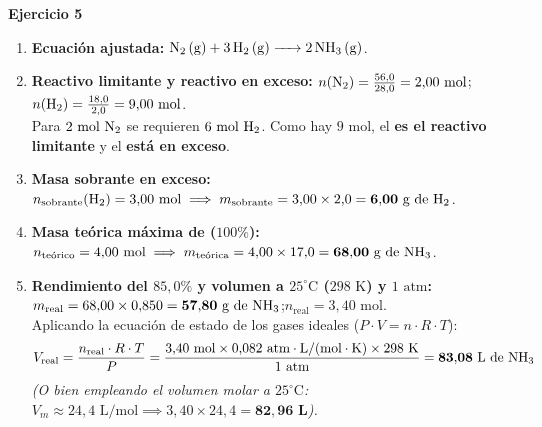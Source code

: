 \documentclass[11pt,a4paper]{article}
\begin{document}
\vspace{0.4cm}
\noindent\textbf{Ejercicio 5}
\begin{enumerate}[label=\textbf{\alph*)}, leftmargin=2em, itemsep=6pt]
    \item \textbf{Ecuación ajustada:} $\ce{N2 (g) + 3 H2 (g) -> 2 NH3 (g)}$.
    \item \textbf{Reactivo limitante y reactivo en exceso:}
    $n(\ce{N2}) = \frac{56{,}0}{28{,}0} = 2{,}00\text{ mol}$; $n(\ce{H2}) = \frac{18{,}0}{2{,}0} = 9{,}00\text{ mol}$.\\
    Para $2\text{ mol } \ce{N2}$ se requieren $6\text{ mol } \ce{H2}$. Como hay $9\text{ mol}$, el \textbf{ es el reactivo limitante} y el \textbf{ está en exceso}.
    \item \textbf{Masa sobrante en exceso:} $n_{\text{sobrante}}(\ce{H2}) = 3{,}00\text{ mol} \implies m_{\text{sobrante}} = 3{,}00 \times 2{,}0 = \mathbf{6{,}00\text{ g de } \ce{H2}}$.
    \item \textbf{Masa teórica máxima de  ($100\%$):} $n_{\text{teórico}} = 4{,}00\text{ mol} \implies m_{\text{teórica}} = 4{,}00 \times 17{,}0 = \mathbf{68{,}00\text{ g de } \ce{NH3}}$.
    \item \textbf{Rendimiento del $85{,}0\%$ y volumen a $25^\circ\text{C}$ ($298\text{ K}$) y $1\text{ atm}$:}
    $m_{\text{real}} = 68{,}00 \times 0{,}850 = \mathbf{57{,}80\text{ g de } \ce{NH3}}$;\quad $n_{\text{real}} = 3{,}40\text{ mol}$.\\
    Aplicando la ecuación de estado de los gases ideales ($P \cdot V = n \cdot R \cdot T$):
    \[
    V_{\text{real}} = \frac{n_{\text{real}} \cdot R \cdot T}{P} = \frac{3{,}40\text{ mol} \times 0{,}082\text{ atm}\cdot\text{L}/(\text{mol}\cdot\text{K}) \times 298\text{ K}}{1\text{ atm}} = \mathbf{83{,}08\text{ L de } \ce{NH3}}
    \]
    \textit{(O bien empleando el volumen molar a $25^\circ\text{C}$: $V_m \approx 24{,}4\text{ L/mol} \implies 3{,}40 \times 24{,}4 = \mathbf{82{,}96\text{ L}}$).}
\end{enumerate}

\newpage
\end{document}
